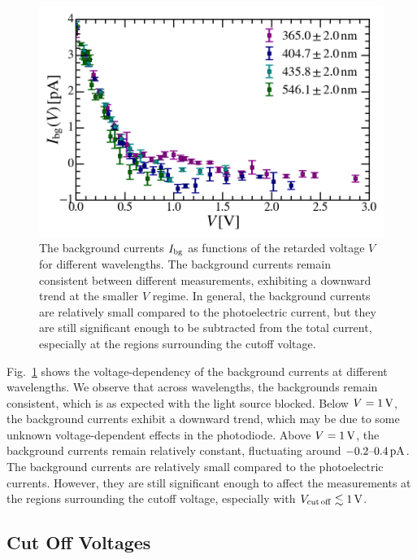 \documentclass[aps,twocolumn,secnumarabic,balancelastpage,amsmath,amssymb,nofootinbib,floatfix]{revtex4-1}
\newcommand{\pA}{\,{\rm pA}}
\newcommand{\V}{\,{\rm V}}
\begin{document}
\begin{figure}
    \centering
    \includegraphics[width=0.49 \textwidth]{Figures/background.png}
    \caption{The background currents $I_{\rm{bg}}$ as functions of the retarded voltage $V$ for different wavelengths. The background currents remain consistent between different measurements, exhibiting a downward trend at the smaller $V$ regime. In general, the background currents are relatively small compared to the photoelectric current, but they are still significant enough to be subtracted from the total current, especially at the regions surrounding the cutoff voltage.}
    \label{fig:background}
\end{figure}

Fig.~\ref{fig:background} shows the voltage-dependency of the background currents at different wavelengths. We observe that across wavelengths, the backgrounds remain consistent, which is as expected with the light source blocked. Below $V = 1\V$, the background currents exhibit a downward trend, which may be due to some unknown voltage-dependent effects in the photodiode. Above $V = 1\V$, the background currents remain relatively constant, fluctuating around $-0.2 \text{--} 0.4\pA$. The background currents are relatively small compared to the photoelectric currents. However, they are still significant enough to affect the measurements at the regions surrounding the cutoff voltage, especially with $V_{\rm{cut\,off}} \lesssim 1\V$.

\subsection{Cut Off Voltages}
\label{sec:cut_off_voltages}
\end{document}
